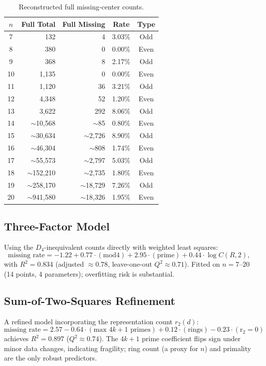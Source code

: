 \documentclass[11pt,a4paper]{article}
\theoremstyle{plain}
\theoremstyle{definition}
\begin{document}
\begin{table}[H]
\centering
\caption{Reconstructed full missing-center counts.}
\label{tab:fullrecon}
\footnotesize
\begin{tabular}{crrcc}
\toprule
$n$ & Full Total & Full Missing & Rate & Type \\
\midrule
7 & 132 & 4 & 3.03\% & Odd \\
8 & 380 & 0 & 0.00\% & Even \\
9 & 368 & 8 & 2.17\% & Odd \\
10 & 1,135 & 0 & 0.00\% & Even \\
11 & 1,120 & 36 & 3.21\% & Odd \\
12 & 4,348 & 52 & 1.20\% & Even \\
13 & 3,622 & 292 & 8.06\% & Odd \\
14 & $\sim$10,568 & $\sim$85 & 0.80\% & Even \\
15 & $\sim$30,634 & $\sim$2,726 & 8.90\% & Odd \\
16 & $\sim$46,304 & $\sim$808 & 1.74\% & Even \\
17 & $\sim$55,573 & $\sim$2,797 & 5.03\% & Odd \\
18 & $\sim$152,210 & $\sim$2,735 & 1.80\% & Even \\
19 & $\sim$258,170 & $\sim$18,729 & 7.26\% & Odd \\
20 & $\sim$941,580 & $\sim$18,326 & 1.95\% & Even \\
\bottomrule
\end{tabular}
\end{table}

\subsection{Three-Factor Model}

Using the $D_4$-inequivalent counts directly with weighted least squares:
\[
\text{missing rate} = -1.22 + 0.77\cdot(\text{mod4}) + 2.95\cdot(\text{prime}) + 0.44\cdot\log C(R,2),
\]
with $R^2 = 0.834$ (adjusted $\approx 0.78$, leave-one-out $Q^2 \approx 0.71$). Fitted on $n=7$--$20$ (14 points, 4 parameters); overfitting risk is substantial.

\subsection{Sum-of-Two-Squares Refinement}

A refined model incorporating the representation count $r_2(d)$:
\[
\text{missing rate} = 2.57 - 0.64\cdot(\text{max }4k+1\text{ primes}) + 0.12\cdot(\text{rings}) - 0.23\cdot(\text{r}_2=0)
\]
achieves $R^2=0.897$ ($Q^2\approx0.74$). The $4k+1$ prime coefficient flips sign under minor data changes, indicating fragility; ring count (a proxy for $n$) and primality are the only robust predictors.



\end{document}
